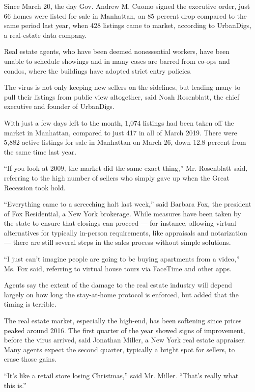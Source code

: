 Since March 20, the day Gov. Andrew M. Cuomo signed the executive order,
just 66 homes were listed for sale in Manhattan, an 85 percent drop
compared to the same period last year, when 428 listings came to market,
according to UrbanDigs, a real-estate data company.

Real estate agents, who have been deemed nonessential workers, have been
unable to schedule showings and in many cases are barred from co-ops and
condos, where the buildings have adopted strict entry policies.

The virus is not only keeping new sellers on the sidelines, but leading
many to pull their listings from public view altogether, said Noah
Rosenblatt, the chief executive and founder of UrbanDigs.

With just a few days left to the month, 1,074 listings had been taken
off the market in Manhattan, compared to just 417 in all of March 2019.
There were 5,882 active listings for sale in Manhattan on March 26, down
12.8 percent from the same time last year.

``If you look at 2009, the market did the same exact thing,'' Mr.
Rosenblatt said, referring to the high number of sellers who simply gave
up when the Great Recession took hold.

``Everything came to a screeching halt last week,'' said Barbara Fox,
the president of Fox Residential, a New York brokerage. While measures
have been taken by the state to ensure that closings can proceed --- for
instance, allowing virtual alternatives for typically in-person
requirements, like appraisals and notarization --- there are still
several steps in the sales process without simple solutions.

``I just can't imagine people are going to be buying apartments from a
video,'' Ms. Fox said, referring to virtual house tours via FaceTime and
other apps.

Agents say the extent of the damage to the real estate industry will
depend largely on how long the stay-at-home protocol is enforced, but
added that the timing is terrible.

The real estate market, especially the high-end, has been softening
since prices peaked around 2016. The first quarter of the year showed
signs of improvement, before the virus arrived, said Jonathan Miller, a
New York real estate appraiser. Many agents expect the second quarter,
typically a bright spot for sellers, to erase those gains.

``It's like a retail store losing Christmas,'' said Mr. Miller. ``That's
really what this is.''

